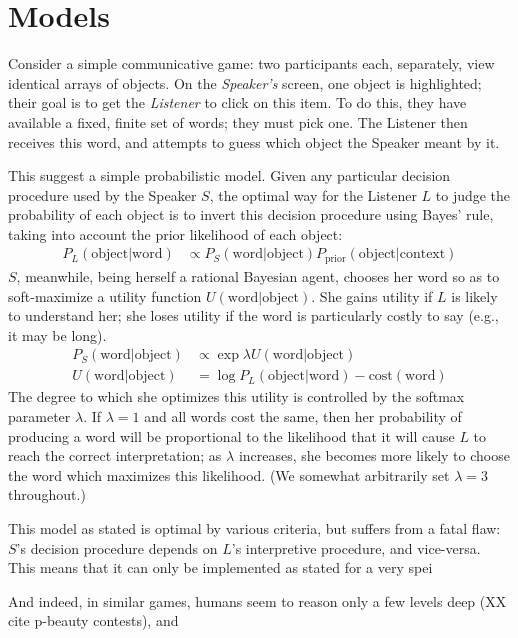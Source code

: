 \documentclass{article} %
\newcommand{\word}{\text{word}}
\newcommand{\obj}{\text{object}}
\begin{document}
\section{Models}

Consider a simple communicative game: two participants each,
separately, view identical arrays of objects. On the
\textit{Speaker's} screen, one object is highlighted; their goal is to
get the \textit{Listener} to click on this item. To do this, they have
available a fixed, finite set of words; they must pick one. The
Listener then receives this word, and attempts to guess which object
the Speaker meant by it.

This suggest a simple probabilistic model. Given any particular
decision procedure used by the Speaker $S$, the optimal way for the
Listener $L$ to judge the probability of each object is to invert this
decision procedure using Bayes' rule, taking into account the prior
likelihood of each object:
\begin{align*}
P_L(\obj | \word) &\propto P_S(\word | \obj) P_{\text{prior}}(\obj |
\text{context})
\end{align*}
$S$, meanwhile, being herself a rational Bayesian agent, chooses her
word so as to soft-maximize a utility function $U(\word | \obj)$. She
gains utility if $L$ is likely to understand her; she loses utility if
the word is particularly costly to say (e.g., it may be long).
\begin{align*}
P_S(\word | \obj) &\propto \exp \lambda U(\word | \obj) \\
U(\word | \obj) &= \log P_L(\obj | \word) - \text{cost}(\word)
\end{align*}
The degree to which she optimizes this utility is controlled by the
softmax parameter $\lambda$. If $\lambda = 1$ and all words cost the
same, then her probability of producing a word will be proportional to
the likelihood that it will cause $L$ to reach the correct
interpretation; as $\lambda$ increases, she becomes more likely to
choose the word which maximizes this likelihood. (We somewhat
arbitrarily set $\lambda = 3$ throughout.)

This model as stated is optimal by various criteria, but suffers from
a fatal flaw: $S$'s decision procedure depends on $L$'s interpretive
procedure, and vice-versa. This means that it can only be implemented
as stated for a very spei

And indeed, in similar games, humans seem to reason only a few levels
deep (XX cite p-beauty contests), and
\end{document}
